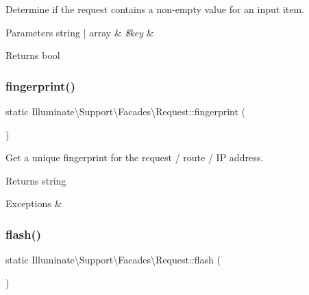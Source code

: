Determine if the request contains a non-\/empty value for an input item.


\begin{DoxyParams}[1]{Parameters}
string | array & {\em \$key} & \\
\hline
\end{DoxyParams}
\begin{DoxyReturn}{Returns}
bool 
\end{DoxyReturn}
\mbox{\label{class_illuminate_1_1_support_1_1_facades_1_1_request_a8bc9e7cd157d79c8fb32f2933148ac14}} 
\subsubsection{\texorpdfstring{fingerprint()}{fingerprint()}}
{\footnotesize\ttfamily static Illuminate\textbackslash{}\+Support\textbackslash{}\+Facades\textbackslash{}\+Request\+::fingerprint (\begin{DoxyParamCaption}{ }\end{DoxyParamCaption})\hspace{0.3cm}{\ttfamily [static]}}

Get a unique fingerprint for the request / route / IP address.

\begin{DoxyReturn}{Returns}
string 
\end{DoxyReturn}

\begin{DoxyExceptions}{Exceptions}
{\em } & \\
\hline
\end{DoxyExceptions}
\mbox{\label{class_illuminate_1_1_support_1_1_facades_1_1_request_a149dac682268f43992e9a091bb59be61}} 
\subsubsection{\texorpdfstring{flash()}{flash()}}
{\footnotesize\ttfamily static Illuminate\textbackslash{}\+Support\textbackslash{}\+Facades\textbackslash{}\+Request\+::flash (\begin{DoxyParamCaption}{ }\end{DoxyParamCaption})\hspace{0.3cm}{\ttfamily [static]}}

